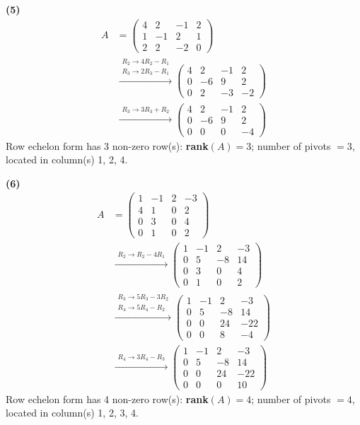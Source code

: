 \noindent\textbf{(5)}
\begin{align*}
A &= \begin{pmatrix}4 & 2 & -1 & 2 \\ 1 & -1 & 2 & 1 \\ 2 & 2 & -2 & 0\end{pmatrix} \\
&\xrightarrow{\substack{R_2\to 4R_2-R_1\\ R_3\to 2R_3-R_1}} \begin{pmatrix}4 & 2 & -1 & 2 \\ 0 & -6 & 9 & 2 \\ 0 & 2 & -3 & -2\end{pmatrix} \\
&\xrightarrow{\substack{R_3\to 3R_3+R_2}} \begin{pmatrix}4 & 2 & -1 & 2 \\ 0 & -6 & 9 & 2 \\ 0 & 0 & 0 & -4\end{pmatrix}
\end{align*}
Row echelon form has 3 non-zero row(s): \textbf{rank}$(A)=3$; number of pivots $=3$, located in column(s) 1, 2, 4.

\noindent\textbf{(6)}
\begin{align*}
A &= \begin{pmatrix}1 & -1 & 2 & -3 \\ 4 & 1 & 0 & 2 \\ 0 & 3 & 0 & 4 \\ 0 & 1 & 0 & 2\end{pmatrix} \\
&\xrightarrow{\substack{R_2\to R_2-4R_1}} \begin{pmatrix}1 & -1 & 2 & -3 \\ 0 & 5 & -8 & 14 \\ 0 & 3 & 0 & 4 \\ 0 & 1 & 0 & 2\end{pmatrix} \\
&\xrightarrow{\substack{R_3\to 5R_3-3R_2\\ R_4\to 5R_4-R_2}} \begin{pmatrix}1 & -1 & 2 & -3 \\ 0 & 5 & -8 & 14 \\ 0 & 0 & 24 & -22 \\ 0 & 0 & 8 & -4\end{pmatrix} \\
&\xrightarrow{\substack{R_4\to 3R_4-R_3}} \begin{pmatrix}1 & -1 & 2 & -3 \\ 0 & 5 & -8 & 14 \\ 0 & 0 & 24 & -22 \\ 0 & 0 & 0 & 10\end{pmatrix}
\end{align*}
Row echelon form has 4 non-zero row(s): \textbf{rank}$(A)=4$; number of pivots $=4$, located in column(s) 1, 2, 3, 4.

